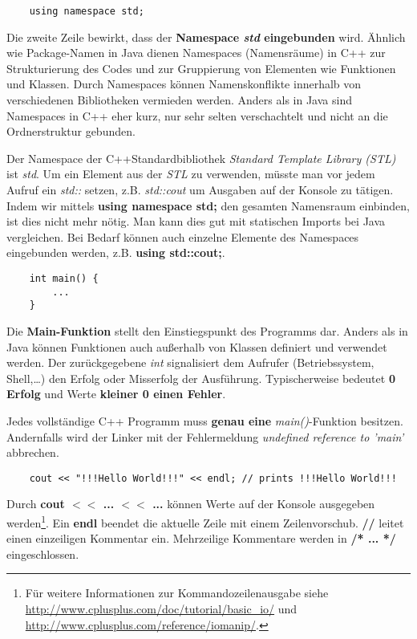 \documentclass[
  accentcolor=tud1c,	%
  colorbacktitle,		%
  inverttitle,			%
  german,				%
  twoside
]{tudexercise}
\begin{document}
\begin{lstlisting}
	using namespace std;
\end{lstlisting}
Die zweite Zeile bewirkt, dass der \textbf{Namespace \emph{std} eingebunden} wird. Ähnlich wie Package-Namen in Java dienen Namespaces (Namensräume) in C++ zur Strukturierung des Codes und zur Gruppierung von Elementen wie Funktionen und Klassen.
Durch Namespaces können Namenskonflikte innerhalb von verschiedenen Bibliotheken vermieden werden.
Anders als in Java sind Namespaces in C++ eher kurz, nur sehr selten verschachtelt und nicht an die Ordnerstruktur gebunden.


Der Namespace der C++Standardbibliothek \emph{Standard Template Library (STL)} ist \emph{std}. 
Um ein Element aus der \emph{STL} zu verwenden, müsste man vor jedem Aufruf ein \emph{std::} setzen, z.B. \emph{std::cout} um Ausgaben auf der Konsole zu tätigen.
Indem wir mittels \textbf{using namespace std;} den gesamten Namensraum einbinden, ist dies nicht mehr nötig.
Man kann dies gut mit statischen Imports bei Java vergleichen.
Bei Bedarf können auch einzelne Elemente des Namespaces eingebunden werden, z.B. \textbf{using std::cout;}.

\begin{lstlisting}
	int main() {
		...
	}
\end{lstlisting}

Die \textbf{Main-Funktion} stellt den Einstiegspunkt des Programms dar.
Anders als in Java können Funktionen auch außerhalb von Klassen definiert und verwendet werden.
Der zurückgegebene \emph{int} signalisiert dem Aufrufer (Betriebssystem, Shell,\dots) den Erfolg oder Misserfolg der Ausführung.
Typischerweise bedeutet \textbf{0 Erfolg} und Werte \textbf{kleiner 0 einen Fehler}.

Jedes vollständige C++ Programm muss \textbf{genau eine }\emph{main()}-Funktion besitzen. Andernfalls wird der Linker mit der Fehlermeldung \emph{undefined reference to 'main'} abbrechen.

\begin{lstlisting}
	cout << "!!!Hello World!!!" << endl; // prints !!!Hello World!!!
\end{lstlisting}
Durch \textbf{cout $<<$ ... $<<$ ...} können Werte auf der Konsole ausgegeben werden\footnote{
Für weitere Informationen zur Kommandozeilenausgabe siehe \url{http://www.cplusplus.com/doc/tutorial/basic_io/} und \url{http://www.cplusplus.com/reference/iomanip/}.
}.
Ein \textbf{endl} beendet die aktuelle Zeile mit einem Zeilenvorschub.
\textbf{//} leitet einen einzeiligen Kommentar ein.
Mehrzeilige Kommentare werden in \textbf{/* ... */} eingeschlossen.
\end{document}

